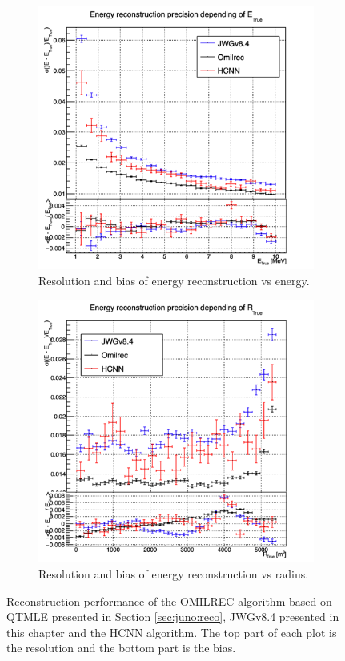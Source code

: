 \documentclass[../main.tex]{subfiles}
\begin{document}
\begin{figure}[ht]
  \centering
  \begin{subfigure}[t]{0.48\linewidth}
    \centering
    \includegraphics[width=\linewidth]{images/jgnn/hcnn/MESBvETC.png}
    \caption{Resolution and bias of energy reconstruction vs energy.}
    \label{fig:jgnn:MESBvETC_hcnn}
  \end{subfigure}
  \begin{subfigure}[t]{0.48\linewidth}
    \centering
    \includegraphics[width=\linewidth]{images/jgnn/hcnn/MESBvRTC.png}
    \caption{Resolution and bias of energy reconstruction vs radius.}
    \label{fig:jgnn:MESBvRTC_hcnn}
  \end{subfigure}
  \caption{Reconstruction performance of the OMILREC algorithm based on QTMLE presented in Section \ref{sec:juno:reco}, JWGv8.4 presented in this chapter and the HCNN algorithm. The top part of each plot is the resolution and the bottom part is the bias.}
  \label{fig:jgnn:results_hcnn_1}
\end{figure}
\end{document}
